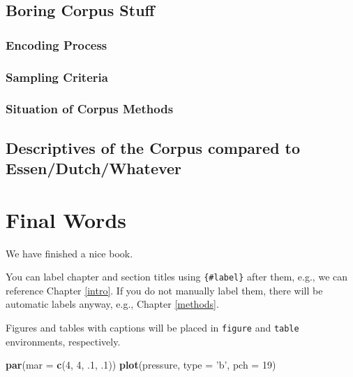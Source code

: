 \documentclass[]{book}
\newenvironment{Shaded}{\begin{snugshade}}{\end{snugshade}}
\newcommand{\DataTypeTok}[1]{\textcolor[rgb]{0.13,0.29,0.53}{#1}}
\newcommand{\DecValTok}[1]{\textcolor[rgb]{0.00,0.00,0.81}{#1}}
\newcommand{\FloatTok}[1]{\textcolor[rgb]{0.00,0.00,0.81}{#1}}
\newcommand{\KeywordTok}[1]{\textcolor[rgb]{0.13,0.29,0.53}{\textbf{#1}}}
\newcommand{\NormalTok}[1]{#1}
\newcommand{\StringTok}[1]{\textcolor[rgb]{0.31,0.60,0.02}{#1}}
\theoremstyle{definition}
\theoremstyle{definition}
\theoremstyle{definition}
\theoremstyle{remark}
\begin{document}
\hypertarget{boring-corpus-stuff}{%
\section{Boring Corpus Stuff}\label{boring-corpus-stuff}}

\hypertarget{encoding-process}{%
\subsection{Encoding Process}\label{encoding-process}}

\hypertarget{sampling-criteria}{%
\subsection{Sampling Criteria}\label{sampling-criteria}}

\hypertarget{situation-of-corpus-methods}{%
\subsection{Situation of Corpus
Methods}\label{situation-of-corpus-methods}}

\hypertarget{descriptives-of-the-corpus-compared-to-essendutchwhatever}{%
\section{Descriptives of the Corpus compared to
Essen/Dutch/Whatever}\label{descriptives-of-the-corpus-compared-to-essendutchwhatever}}

\hypertarget{final-words}{%
\chapter{Final Words}\label{final-words}}

We have finished a nice book.

You can label chapter and section titles using \texttt{\{\#label\}}
after them, e.g., we can reference Chapter \ref{intro}. If you do not
manually label them, there will be automatic labels anyway, e.g.,
Chapter \ref{methods}.

Figures and tables with captions will be placed in \texttt{figure} and
\texttt{table} environments, respectively.

\begin{Shaded}
\begin{Highlighting}[]
\KeywordTok{par}\NormalTok{(}\DataTypeTok{mar =} \KeywordTok{c}\NormalTok{(}\DecValTok{4}\NormalTok{, }\DecValTok{4}\NormalTok{, }\FloatTok{.1}\NormalTok{, }\FloatTok{.1}\NormalTok{))}
\KeywordTok{plot}\NormalTok{(pressure, }\DataTypeTok{type =} \StringTok{'b'}\NormalTok{, }\DataTypeTok{pch =} \DecValTok{19}\NormalTok{)}
\end{Highlighting}
\end{Shaded}
\end{document}
